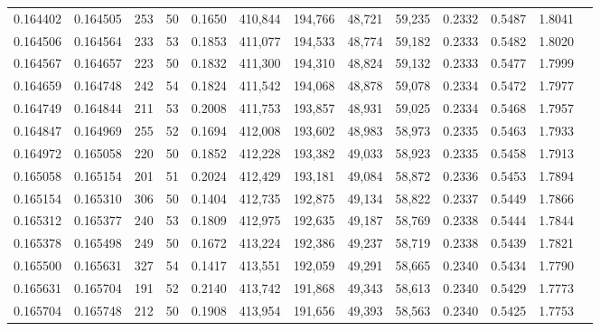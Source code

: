 \begin{tabular}{rrrrrrrrrrrrr}
0.164402 & 0.164505 &   253 &  50 &                                     0.1650 & 410,844 & 194,766 &  48,721 &  59,235 & 0.2332 & 0.5487 & 1.8041 \\
0.164506 & 0.164564 &   233 &  53 &                                     0.1853 & 411,077 & 194,533 &  48,774 &  59,182 & 0.2333 & 0.5482 & 1.8020 \\
0.164567 & 0.164657 &   223 &  50 &                                     0.1832 & 411,300 & 194,310 &  48,824 &  59,132 & 0.2333 & 0.5477 & 1.7999 \\
0.164659 & 0.164748 &   242 &  54 &                                     0.1824 & 411,542 & 194,068 &  48,878 &  59,078 & 0.2334 & 0.5472 & 1.7977 \\
0.164749 & 0.164844 &   211 &  53 &                                     0.2008 & 411,753 & 193,857 &  48,931 &  59,025 & 0.2334 & 0.5468 & 1.7957 \\
0.164847 & 0.164969 &   255 &  52 &                                     0.1694 & 412,008 & 193,602 &  48,983 &  58,973 & 0.2335 & 0.5463 & 1.7933 \\
0.164972 & 0.165058 &   220 &  50 &                                     0.1852 & 412,228 & 193,382 &  49,033 &  58,923 & 0.2335 & 0.5458 & 1.7913 \\
0.165058 & 0.165154 &   201 &  51 &                                     0.2024 & 412,429 & 193,181 &  49,084 &  58,872 & 0.2336 & 0.5453 & 1.7894 \\
0.165154 & 0.165310 &   306 &  50 &                                     0.1404 & 412,735 & 192,875 &  49,134 &  58,822 & 0.2337 & 0.5449 & 1.7866 \\
0.165312 & 0.165377 &   240 &  53 &                                     0.1809 & 412,975 & 192,635 &  49,187 &  58,769 & 0.2338 & 0.5444 & 1.7844 \\
0.165378 & 0.165498 &   249 &  50 &                                     0.1672 & 413,224 & 192,386 &  49,237 &  58,719 & 0.2338 & 0.5439 & 1.7821 \\
0.165500 & 0.165631 &   327 &  54 &                                     0.1417 & 413,551 & 192,059 &  49,291 &  58,665 & 0.2340 & 0.5434 & 1.7790 \\
0.165631 & 0.165704 &   191 &  52 &                                     0.2140 & 413,742 & 191,868 &  49,343 &  58,613 & 0.2340 & 0.5429 & 1.7773 \\
0.165704 & 0.165748 &   212 &  50 &                                     0.1908 & 413,954 & 191,656 &  49,393 &  58,563 & 0.2340 & 0.5425 & 1.7753 \\

\end{tabular}
